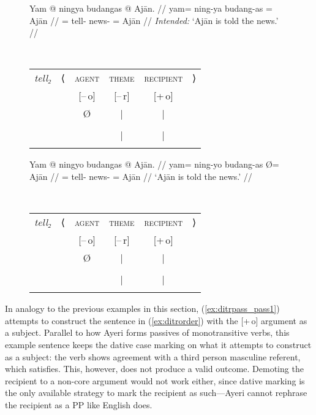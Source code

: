 \begin{figure}
\pex\label{ex:ditrpass}
\a\label{ex:ditrpass_pass1}%
\ljudge*\begin{minipage}[t]{.4\remaining}
\begingl
	\gla Yam @ ningya budangas {} @ Ajān. //
	\glb yam= ning-ya budang-as \Top= Ajān //
	\glc \DatT{}= tell-\TsgM{} news-\Parg{} \Top{}= Ajān //
	\glft \textit{Intended:} `Ajān is told the news.' //
\endgl
\end{minipage}
~
\begin{tabular}[t]{>{\itshape}l l c c c r}
tell₂
	& ⟨
	& \textsc{agent}
	& \textsc{theme}
	& \textsc{recipient}
	& ⟩
	\\
%
	& %
	& [–\,o]
	& [–\,r]
	& [+\,o]
	& %
	\\

%
	& %
	& Ø
	& |
	& |
	& %
	\\

%
	& %
	& %
	& \Obj
	& \Subj*
	& %
	\\

%
	& %
	& %
	& |
	& |
	& %
	\\

%
	& %
	& %
	& \fw{news}
	& \fw{Ajān}
	& %
	\\
\end{tabular}

\a\label{ex:ditrpass_pass2}%
\begin{minipage}[t]{.4\remaining}
\begingl
	\gla Yam @ ningyo budangas {} @ Ajān. //
	\glb yam= ning-yo budang-as Ø= Ajān //
	\glc \DatT{}= tell-\TsgN{} news-\Parg{} \Top{}= Ajān //
	\glft `Ajān is told the news.' //
\endgl
\end{minipage}
~
\begin{tabular}[t]{>{\itshape}l l c c c r}
tell₂
	& ⟨
	& \textsc{agent}
	& \textsc{theme}
	& \textsc{recipient}
	& ⟩
	\\
%
	& %
	& [–\,o]
	& [–\,r]
	& [+\,o]
	& %
	\\

%
	& %
	& Ø
	& |
	& |
	& %
	\\

%
	& %
	& %
	& \Subj
	& \Obj*
	& %
	\\

%
	& %
	& %
	& |
	& |
	& %
	\\

%
	& %
	& %
	& \fw{news}
	& \fw{Ajān}
	& %
	\\
\end{tabular}
\xe
\end{figure}

In analogy to the previous examples in this section, (\ref{ex:ditrpass_pass1})
attempts to construct the sentence in (\ref{ex:ditrorder}) with the [+\,o]
argument as a subject. Parallel to how Ayeri forms passives of monotransitive
verbs, this example sentence keeps the dative case marking on what it attempts
to construct as a subject: the verb shows agreement with a third person
masculine referent, which  satisfies. This, however, does
not produce a valid outcome. Demoting the recipient to a non-core argument
would not work either, since dative marking is the only available strategy to
mark the recipient as such---Ayeri cannot rephrase the recipient as a PP like
English does.


